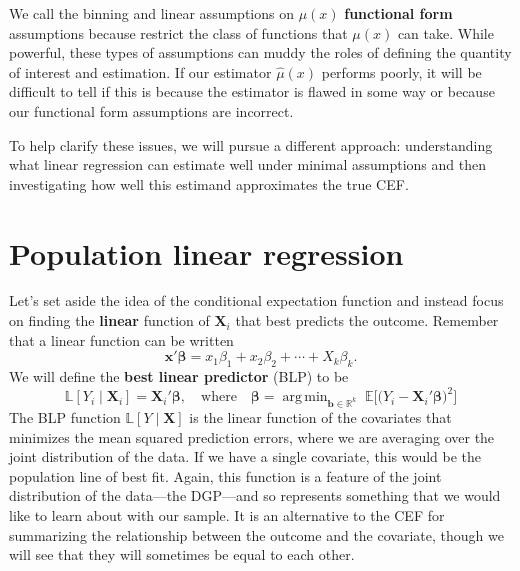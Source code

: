 \documentclass[
  letterpaper,
  DIV=11,
  numbers=noendperiod]{scrreprt}
\newcommand{\mb}{\symbf}
\newcommand{\E}{\mathbb{E}}
\newcommand{\real}{\mathbb{R}}
\newcommand{\bbL}{\mathbb{L}}
\newcommand{\X}{\mb{X}}
\newcommand{\bfx}{\mb{x}}
\newcommand{\bfbeta}{\mb{\beta}}
\DeclareMathOperator*{\argmin}{arg\,min}
\theoremstyle{definition}
\theoremstyle{plain}
\theoremstyle{definition}
\theoremstyle{remark}
\begin{document}
We call the binning and linear assumptions on \(\mu(x)\)
\textbf{functional form} assumptions because restrict the class of
functions that \(\mu(x)\) can take. While powerful, these types of
assumptions can muddy the roles of defining the quantity of interest and
estimation. If our estimator \(\widehat{\mu}(x)\) performs poorly, it
will be difficult to tell if this is because the estimator is flawed in
some way or because our functional form assumptions are incorrect.

To help clarify these issues, we will pursue a different approach:
understanding what linear regression can estimate well under minimal
assumptions and then investigating how well this estimand approximates
the true CEF.

\hypertarget{population-linear-regression}{%
\section{Population linear
regression}\label{population-linear-regression}}

Let's set aside the idea of the conditional expectation function and
instead focus on finding the \textbf{linear} function of \(\X_i\) that
best predicts the outcome. Remember that a linear function can be
written \[ 
\bfx'\bfbeta = x_{1}\beta_{1} + x_{2}\beta_{2} + \cdots + X_{k}\beta_{k}.
\] We will define the \textbf{best linear predictor} (BLP) to be \[ 
\bbL[Y_{i} \mid \X_{i}] =\X_{i}'\bfbeta, \quad \text{where}\quad \bfbeta = \argmin_{\mb{b} \in \real^k}\; \E\bigl[ \bigl(Y_{i} - \mb{X}_{i}'\bfbeta \bigr)^2\bigr]
\] The BLP function \(\bbL[Y \mid \X]\) is the linear function of the
covariates that minimizes the mean squared prediction errors, where we
are averaging over the joint distribution of the data. If we have a
single covariate, this would be the population line of best fit. Again,
this function is a feature of the joint distribution of the data---the
DGP---and so represents something that we would like to learn about with
our sample. It is an alternative to the CEF for summarizing the
relationship between the outcome and the covariate, though we will see
that they will sometimes be equal to each other.
\end{document}
